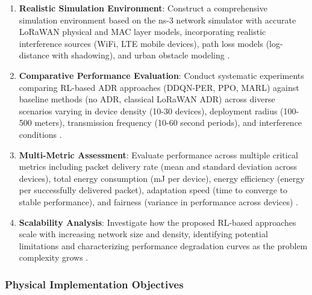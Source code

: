 \documentclass[12pt,a4paper]{article}
\begin{document}
\begin{enumerate}
    \item \textbf{Realistic Simulation Environment}: Construct a comprehensive simulation environment based on the ns-3 network simulator with accurate LoRaWAN physical and MAC layer models, incorporating realistic interference sources (WiFi, LTE mobile devices), path loss models (log-distance with shadowing), and urban obstacle modeling \cite{bianchi2019experimental}.
    
    \item \textbf{Comparative Performance Evaluation}: Conduct systematic experiments comparing RL-based ADR approaches (DDQN-PER, PPO, MARL) against baseline methods (no ADR, classical LoRaWAN ADR) across diverse scenarios varying in device density (10-30 devices), deployment radius (100-500 meters), transmission frequency (10-60 second periods), and interference conditions \cite{reynders2018improving}.
    
    \item \textbf{Multi-Metric Assessment}: Evaluate performance across multiple critical metrics including packet delivery rate (mean and standard deviation across devices), total energy consumption (mJ per device), energy efficiency (energy per successfully delivered packet), adaptation speed (time to converge to stable performance), and fairness (variance in performance across devices) \cite{slabicki2018adaptive}.
    
    \item \textbf{Scalability Analysis}: Investigate how the proposed RL-based approaches scale with increasing network size and density, identifying potential limitations and characterizing performance degradation curves as the problem complexity grows \cite{bankov2017should}.
\end{enumerate}

\subsubsection{Physical Implementation Objectives}
\end{document}
